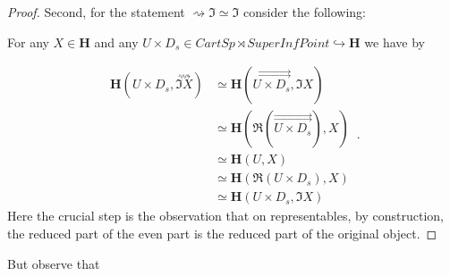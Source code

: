 \documentclass[12pt,titlepage]{article}
\theoremstyle{plain}
\theoremstyle{definition}
\theoremstyle{remark}
\begin{document}
\begin{proof}
Second, for the statement $\rightsquigarrow \Im \simeq \Im$ consider the following:

For any $X \in \mathbf{H}$ and any $U \times D_s\in CartSp \rtimes SuperInfPoint \hookrightarrow \mathbf{H}$ we have by  

\begin{displaymath}
\begin{aligned}
    \mathbf{H}(U \times D_s , \stackrel{\rightsquigarrow}{\Im X})
    & \simeq
    \mathbf{H}(\stackrel{\rightrightarrows}{U \times D_s} , \Im X)
    \\
    &\simeq
    \mathbf{H}(\Re(\stackrel{\rightrightarrows}{U \times D_s}) , X)
    \\
    & \simeq
    \mathbf{H}(U, X)
    \\
    & \simeq
    \mathbf{H}(\Re(U \times D_s), X)
    \\
    & \simeq \mathbf{H}(U \times D_s, \Im X)
  \end{aligned}
  \,.
\end{displaymath}
Here the crucial step is the observation that on representables, by construction, the reduced part of the even part is the reduced part of the original object.

\end{proof}
But observe that
\end{document}
